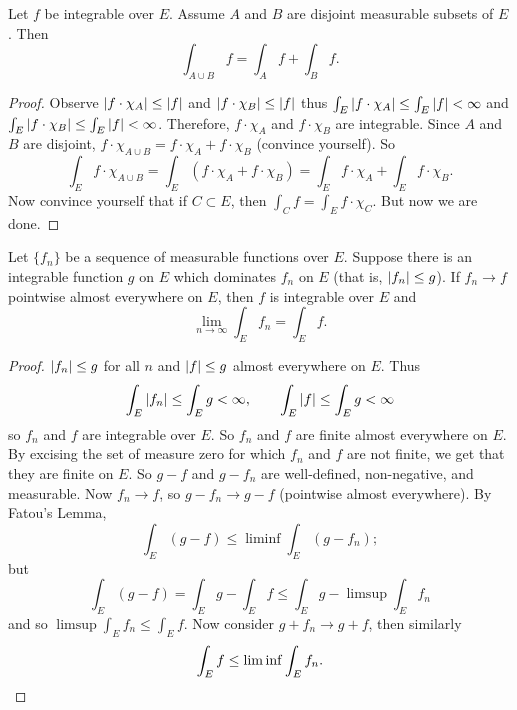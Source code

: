 
\begin{corollary}
	Let $f$ be integrable over $E$.
	Assume $A$ and $B$ are disjoint measurable subsets of $E$.
	Then
	\[\int_{A \cup B} f = \int_A f + \int_B f.\]
\end{corollary}

\begin{proof}
	Observe $\left\lvert f \cdot \chi_A \right\rvert \leq \left\lvert f \right\rvert$
	and $\left\lvert f \cdot \chi_B \right\rvert \leq \left\lvert f \right\rvert$
	thus $\int_E \left\lvert f \cdot \chi_A \right\rvert \leq \int_E \left\lvert f \right\rvert < \infty$
	and $\int_E \left\lvert f \cdot \chi_B \right\rvert \leq \int_E \left\lvert f \right\rvert < \infty$.
	Therefore, $f \cdot \chi_A$ and $f \cdot \chi_B$ are integrable.
	Since $A$ and $B$ are disjoint,
	$f \cdot \chi_{A \cup B} = f \cdot \chi_A + f \cdot \chi_B$
	(convince yourself).
	So
	\[
		\int_E f \cdot \chi_{A \cup B}
		= \int_E \left(f \cdot \chi_A + f \cdot \chi_B\right)
		= \int_E f \cdot \chi_A + \int_E f \cdot \chi_B.
	\]
	Now convince yourself that if $C \subset E$, 
	then $\int_C f = \int_E f \cdot \chi_C$.
	But now we are done.
\end{proof}

\begin{theorem}
	Let $\{f_n\}$ be a sequence of measurable functions over $E$.
	Suppose there is an integrable function $g$ on $E$
	which dominates $f_n$ on $E$
	(that is, $\left\lvert f_n \right\rvert \leq g$).
	If $f_n \to f$ pointwise almost everywhere on $E$, then $f$ is integrable
	over $E$ and
	\[\lim_{n \to \infty} \int_E f_n = \int_E f.\]
\end{theorem}

\begin{proof}
	$\left\lvert f_n \right\rvert \leq g$ for all $n$ and $\left\lvert f \right\rvert \leq g$ almost everywhere on
	$E$.
	Thus
	\[
		\int_E \left\lvert f_n \right\rvert \leq \int_E g < \infty, \qquad
		\int_E \left\lvert f \right\rvert \leq \int_E g < \infty
	\]
	so $f_n$ and $f$ are integrable over $E$.
	So $f_n$ and $f$ are finite almost everywhere on $E$.
	By excising the set of measure zero for which $f_n$ and $f$
	are not finite, we get that they are finite on $E$.
	So $g - f$ and $g - f_n$ are well-defined,
	non-negative, and measurable.
	Now $f_n \to f$, so $g - f_n \to g - f$ (pointwise almost everywhere).
	By Fatou's Lemma,
	\[
		\int_E (g - f) \leq \liminf\int_E (g - f_n);
	\]
	but
	\[
		\int_E (g - f)
		= \int_E g - \int_E f
		\leq \int_E g - \limsup\int_E f_n
	\]
	and so $\limsup\int_E f_n \leq \int_E f$.
	Now consider $g + f_n \to g + f$, then similarly
	\[
		\int_E f \leq \liminf\int_E f_n. \qedhere
	\]
\end{proof}

